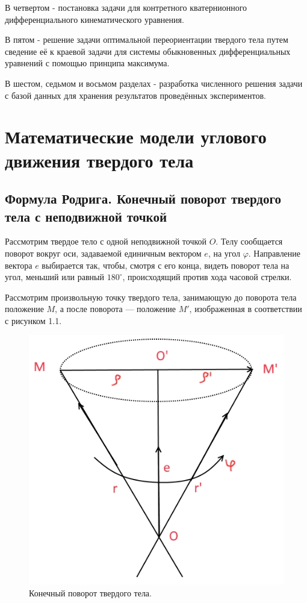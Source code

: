 \documentclass[14pt]{extreport}
\renewcommand{\phi}{\varphi} %
\begin{document}
В четвертом - постановка задачи для контретного кватернионного дифференциального кинематического уравнения.

В пятом - решение задачи оптимальной переориентации твердого тела путем сведение её к краевой задачи для системы обыкновенных дифференциальных уравнений с помощью принципа максимума.

В шестом, седьмом и восьмом разделах - разработка численного решения задачи с базой данных для хранения результатов проведённых экспериментов.

\chapter{Математические модели углового движения твердого тела}
\section{Формула Родрига. Конечный поворот твердого тела с неподвижной точкой}

Рассмотрим твердое тело с одной неподвижной точкой $O$. Телу сообща­ется поворот вокруг оси, задаваемой единичным вектором $e$, на угол $\phi$. Направление вектора $e$ выбирается так, чтобы, смотря с его конца, видеть поворот тела на угол, меньший или равный $180^{\circ}$, происходящий против хода часовой стрелки.

Рассмотрим произвольную точку твердого тела, занимающую до по­ворота тела положение $M$, а после поворота — положение $M'$, изображенная в соответствии с рисунком 1.1.

\begin{figure}[H]
\center\includegraphics[scale=0.5]{fig/img11.png}
\caption{Конечный поворот твердого тела.}
\end{figure}
\end{document}
